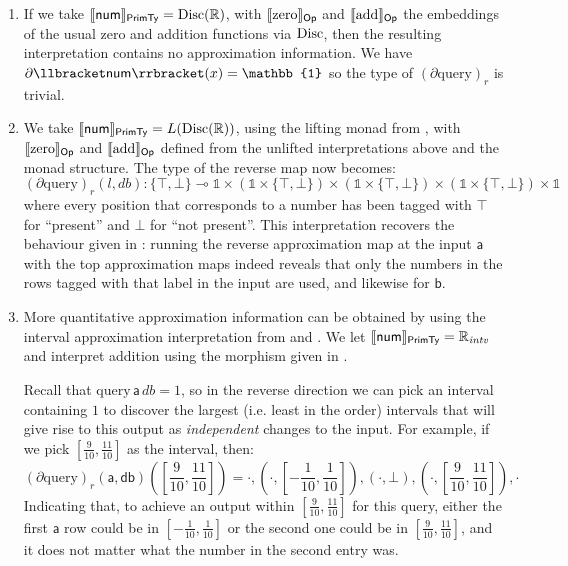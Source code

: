 \begin{enumerate}
\item If we take $\llbracket \mathsf{num} \rrbracket_{\mathsf{PrimTy}} = \mathrm{Disc}(\mathbb{R})$, with $\llbracket \mathrm{zero} \rrbracket_{\mathsf{Op}}$ and
  $\llbracket \mathrm{add} \rrbracket_{\mathsf{Op}}$ the embeddings of the usual zero and addition functions via $\mathrm{Disc}$, then the
  resulting interpretation contains no approximation information. We have
  $\partial\sem{\mathsf{num}}(x) = \mathbb{1}$ so the type of $(\partial \mathrm{query})_r$ is trivial.
\item We take $\llbracket \mathsf{num} \rrbracket_{\mathsf{PrimTy}} = L(\mathrm{Disc}(\mathbb{R}))$, using the lifting monad from
  , with $\llbracket \mathrm{zero} \rrbracket_{\mathsf{Op}}$ and
  $\llbracket \mathrm{add} \rrbracket_{\mathsf{Op}}$ defined from the unlifted interpretations above and the monad structure. The
  type of the reverse map now becomes:
  \begin{displaymath}
    (\partial \mathrm{query})_r(l, \mathit{db}) : \{\top,\bot\} \multimap \mathbb{1} \times (\mathbb{1} \times \{\top,\bot\}) \times (\mathbb{1} \times \{\top,\bot\}) \times (\mathbb{1} \times \{\top,\bot\}) \times \mathbb{1}
  \end{displaymath}
  where every position that corresponds to a number has been tagged with $\top$ for ``present'' and $\bot$ for
  ``not present''. This interpretation recovers the behaviour given in : running
  the reverse approximation map at the input $\mathsf{a}$ with the top approximation maps indeed reveals that
  only the numbers in the rows tagged with that label in the input are used, and likewise for $\mathsf{b}$.
\item More quantitative approximation information can be obtained by using the interval approximation
  interpretation from  and . We let
  $\llbracket \mathsf{num} \rrbracket_{\mathsf{PrimTy}} = \mathbb{R}_{\mathit{intv}}$ and interpret addition using the morphism given
  in .

  Recall that $\mathrm{query}\,\mathsf{a}\,\mathit{db} = 1$, so in the reverse direction we can pick an
  interval containing $1$ to discover the largest (i.e. least in the order) intervals that will give rise to
  this output as \emph{independent} changes to the input. For example, if we pick
  $[\frac{9}{10},\frac{11}{10}]$ as the interval, then:
  \begin{displaymath}
    (\partial\mathrm{query})_r(\mathsf{a},\mathsf{db})([\frac{9}{10},\frac{11}{10}]) = \cdot, (\cdot,[-\frac{1}{10},\frac{1}{10}]),(\cdot,\bot),(\cdot,[\frac{9}{10},\frac{11}{10}]), \cdot
  \end{displaymath}
  Indicating that, to achieve an output within $[\frac{9}{10},\frac{11}{10}]$ for this query, either the first
  $\mathsf{a}$ row could be in $[-\frac{1}{10},\frac{1}{10}]$ or the second one could be in
  $[\frac{9}{10},\frac{11}{10}]$, and it does not matter what the number in the second entry was.
\end{enumerate}


